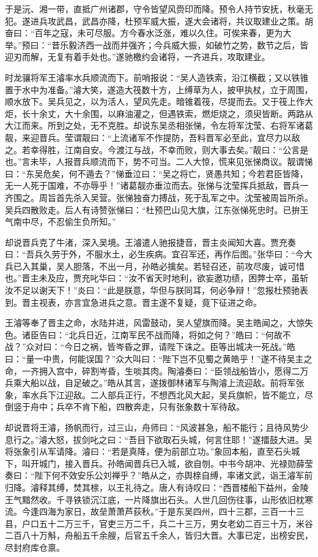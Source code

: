 于是沅、湘一带，直抵广州诸郡，守令皆望风赍印而降。预令人持节安抚，秋毫无犯。遂进兵攻武昌，武昌亦降，杜预军威大振，遂大会诸将，共议取建业之策。胡奋曰：“百年之寇，未可尽服。方今春水泛涨，难以久住。可俟来春，更为大举。”预曰：“昔乐毅济西一战而并强齐；今兵威大振，如破竹之势，数节之后，皆迎刃而解，无复有着手处也。”遂驰檄约会诸将，一齐进兵，攻取建业。

时龙骧将军王濬率水兵顺流而下。前哨报说：“吴人造铁索，沿江横截；又以铁锥置于水中为准备。”濬大笑，遂造大筏数十方，上缚草为人，披甲执杖，立于周围，顺水放下。吴兵见之，以为活人，望风先走。暗锥着筏，尽提而去。又于筏上作大炬，长十余丈，大十余围，以麻油灌之，但遇铁索，燃炬烧之，须臾皆断。两路从大江而来。所到之处，无不克胜。却说东吴丞相张悌，令左将军沈莹、右将军诸葛靓，来迎晋兵。莹谓靓曰：“上流诸军不作提防，吾料晋军必至此，宜尽力以敌之。若幸得胜，江南自安。今渡江与战，不幸而败，则大事去矣。”靓曰：“公言是也。”言未毕，人报晋兵顺流而下，势不可当。二人大惊，慌来见张悌商议。靓谓悌曰：“东吴危矣，何不遁去？”悌垂泣曰：“吴之将亡，贤愚共知；今若君臣皆降，无一人死于国难，不亦辱乎！”诸葛靓亦垂泣而去。张悌与沈莹挥兵抵敌，晋兵一齐围之。周旨首先杀入吴营。张悌独奋力搏战，死于乱军之中。沈莹被周旨所杀。吴兵四散败走。后人有诗赞张悌曰：“杜预巴山见大旗，江东张悌死忠时。已拚王气南中尽，不忍偷生负所知。”

却说晋兵克了牛渚，深入吴境。王濬遣人驰报捷音，晋主炎闻知大喜。贾充奏曰：“吾兵久劳于外，不服水土，必生疾病。宜召军还，再作后图。”张华曰：“今大兵已入其巢，吴人胆落，不出一月，孙皓必擒矣。若轻召还，前攻尽废，诚可惜也。”晋主未及应，贾充叱华曰：“汝不省天时地利，欲妄邀功绩，困弊士卒，虽斩汝不足以谢天下！”炎曰：“此是朕意，华但与朕同耳，何必争辩！”忽报杜预驰表到。晋主视表，亦言宜急进兵之意。晋主遂不复疑，竟下征进之命。

王濬等奉了晋主之命，水陆并进，风雷鼓动，吴人望旗而降。吴主皓闻之，大惊失色。诸臣告曰：“北兵日近，江南军民不战而降，将如之何？”皓曰：“何故不战？”众对曰：“今日之祸，皆岑昏之罪，请陛下诛之。臣等出城决一死战。”皓曰：“量一中贵，何能误国？”众大叫曰：“陛下岂不见蜀之黄皓乎！”遂不待吴主之命，一齐拥入宫中，碎割岑昏，生啖其肉。陶濬奏曰：“臣领战船皆小，愿得二万兵乘大船以战，自足破之。”皓从其言，遂拨御林诸军与陶濬上流迎敌。前将军张象，率水兵下江迎敌。二人部兵正行，不想西北风大起，吴兵旗帜，皆不能立，尽倒竖于舟中；兵卒不肯下船，四散奔走，只有张象数十军待敌。

却说晋将王濬，扬帆而行，过三山，舟师曰：“风波甚急，船不能行；且待风势少息行之。”濬大怒，拔剑叱之曰：“吾目下欲取石头城，何言住耶！”遂擂鼓大进。吴将张象引从军请降。濬曰：“若是真降，便为前部立功。”象回本船，直至石头城下，叫开城门，接入晋兵。孙皓闻晋兵已入城，欲自刎。中书今胡冲、光禄勋薛莹奏曰：“陛下何不效安乐公刘禅乎？”皓从之，亦舆榇自缚，率诸文武，诣王濬军前归降。濬释其缚，焚其榇，以王礼待之。唐人有诗叹曰：“西晋楼船下益州，金陵王气黯然收。千寻铁锁沉江底，一片降旗出石头。人世几回伤往事，山形依旧枕寒流。今逢四海为家日，故垒萧萧芦荻秋。”于是东吴四州，四十三郡，三百一十三县，户口五十二万三千，官吏三万二千，兵二十三万，男女老幼二百三十万，米谷二百八十万斛，舟船五千余艘，后官五千余人，皆归大晋。大事已定，出榜安民，尽封府库仓禀。

